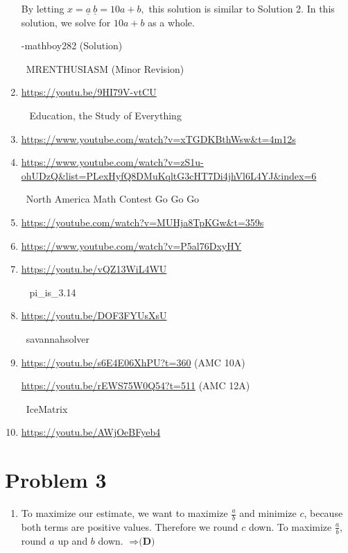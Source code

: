 \documentclass{article}%
\begin{document}
\begin{enumerate}
By letting $x=\underline{a} \ \underline{b}=10a+b,$ this solution is similar to Solution 2. In this solution, we solve for $10a+b$ as a whole.

-mathboy282 (Solution)

~MRENTHUSIASM (Minor Revision)

%
\item%
\href{https://youtu.be/9HI79V-vtCU}{https://youtu.be/9HI79V-vtCU}

~ Education, the Study of Everything

%
\item%
\href{https://www.youtube.com/watch?v=xTGDKBthWsw&t=4m12s}{https://www.youtube.com/watch?v=xTGDKBthWsw&t=4m12s}

%
\item%
\href{https://www.youtube.com/watch?v=zS1u-ohUDzQ&list=PLexHyfQ8DMuKqltG3cHT7Di4jhVl6L4YJ&index=6}{https://www.youtube.com/watch?v=zS1u-ohUDzQ&list=PLexHyfQ8DMuKqltG3cHT7Di4jhVl6L4YJ&index=6}\

~North America Math Contest Go Go Go

%
\item%
\href{https://youtube.com/watch?v=MUHja8TpKGw&t=359s}{https://youtube.com/watch?v=MUHja8TpKGw&t=359s}

%
\item%
\href{https://www.youtube.com/watch?v=P5al76DxyHY}{https://www.youtube.com/watch?v=P5al76DxyHY}

%
\item%
\href{https://youtu.be/vQZ13WiL4WU}{https://youtu.be/vQZ13WiL4WU}

~ pi\_is\_3.14

%
\item%
\href{https://youtu.be/DOF3FYUsXsU}{https://youtu.be/DOF3FYUsXsU}

~savannahsolver

%
\item%
\href{https://youtu.be/s6E4E06XhPU?t=360}{https://youtu.be/s6E4E06XhPU?t=360} (AMC 10A)

\href{https://youtu.be/rEWS75W0Q54?t=511}{https://youtu.be/rEWS75W0Q54?t=511} (AMC 12A)

~IceMatrix

%
\item%
\href{https://youtu.be/AWjOeBFyeb4}{https://youtu.be/AWjOeBFyeb4}

%
\end{enumerate}

%
\section*{Problem 3}%
\label{sec:Problem3}%
\begin{enumerate}%
\item%
To maximize our estimate, we want to maximize $\frac{a}{b}$ and minimize $c$, because both terms are positive values. Therefore we round $c$ down. To maximize $\frac{a}{b}$, round $a$ up and $b$ down. $\Rightarrow \boxed{\textbf{(D)}}$

%
\end{enumerate}
\end{document}

